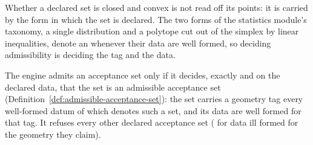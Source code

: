 
Whether a declared set is closed and convex is not read off its points: it
is carried by the form in which the set is declared. The two forms of the
statistics module's taxonomy, a single distribution and a polytope cut out
of the simplex by linear inequalities, denote an  whenever their data are well
formed, so deciding admissibility is deciding the tag and the data.

\begin{requirement}\label{req:acceptance-set-admission}
The engine admits an acceptance set only if it decides, exactly and on the
declared data, that the set is an admissible acceptance set
(Definition~\ref{def:admissible-acceptance-set}): the set carries a geometry
tag every well-formed datum of which denotes such a set, and its data are
well formed for that tag. It refuses every other declared acceptance set
( for data ill formed for the geometry they
claim).
\end{requirement}
